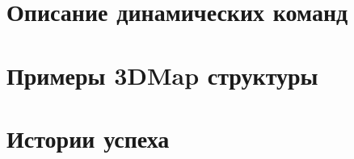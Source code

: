 \documentclass[14pt]{extbook}
\begin{document}
   	\setcounter{secnumdepth}{0}

    \appendix
    
    \chapter{Описание динамических команд}\label{apx:dlib_doc}
    

    \chapter{Примеры 3DMap структуры}\label{apx:3dmap}
    

    \clearpage
    \printglossaries 
    
     \chapter{Истории успеха}
    
\end{document}
